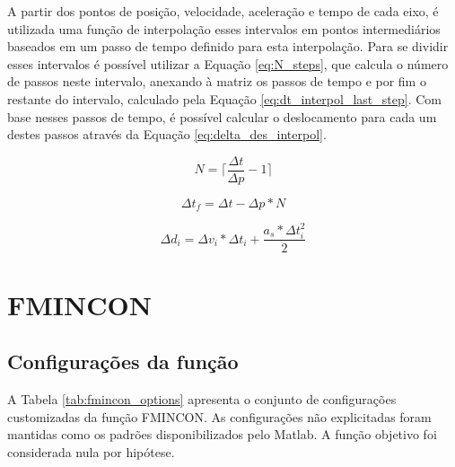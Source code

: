 A partir dos pontos de posição, velocidade, aceleração e tempo de cada eixo, é utilizada uma função de interpolação esses intervalos em pontos intermediários baseados em um passo de tempo definido para esta interpolação. Para se dividir esses intervalos é possível utilizar a Equação \ref{eq:N_steps}, que calcula o número de passos neste intervalo, anexando à matriz os passos de tempo e por fim
o restante do intervalo, calculado pela Equação \ref{eq:dt_interpol_last_step}. Com base nesses passos de tempo, é possível calcular o deslocamento para cada um destes passos através da Equação \ref{eq:delta_des_interpol}.

\begin{equation}
    \label{eq:N_steps}
    N = \lceil\frac{\Delta t}{\Delta p}-1\rceil
\end{equation}

\begin{equation}
    \label{eq:dt_interpol_last_step}
    \Delta t_f= \Delta t - \Delta p*N 
\end{equation}

\begin{equation}
    \label{eq:delta_des_interpol}
    \Delta d_i = \Delta v_i*\Delta t_i+ \frac{a_s*\Delta t_i^2}{2} 
\end{equation}



\section{FMINCON}

\subsection{Configurações da função}

A Tabela \ref{tab:fmincon_options} apresenta o conjunto de configurações customizadas da função FMINCON. As configurações não explicitadas foram mantidas como os padrões disponibilizados pelo Matlab. A função objetivo foi considerada nula por hipótese.

